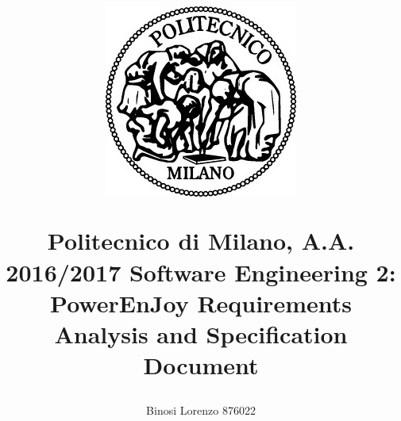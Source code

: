 


\title{
	\begin{figure}[h]
		\centering
		\includegraphics{images/polimi_logo}
	\end{figure}
	Politecnico di Milano, A.A. 2016/2017 
	\newline\newline 
	Software Engineering 2: PowerEnJoy 
	\textbf{R}equirements \textbf{A}nalysis and \textbf{S}pecification \textbf{D}ocument}
\author{Binosi Lorenzo 876022}	
	

	
	\maketitle
	\tableofcontents
	\newpage
	
	
	
	
	
	
	
	
	
